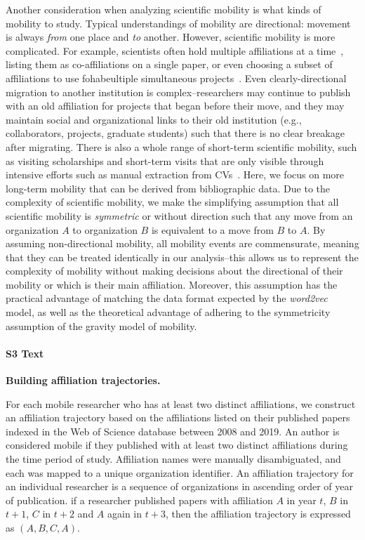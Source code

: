 \documentclass[12pt]{article} %
\begin{document}
Another consideration when analyzing scientific mobility is what kinds of mobility to study.
Typical understandings of mobility are directional: movement is always \textit{from} one place and \textit{to} another.
However, scientific mobility is more complicated.
For example, scientists often hold multiple affiliations at a time~\autocite{markova2016synchronous}, listing them as co-affiliations on a single paper, or even choosing a subset of affiliations to use fohabeultiple simultaneous projects~\autocite{robinson2019mobility}.
Even clearly-directional migration to another institution is complex--researchers may continue to publish with an old affiliation for projects that began before their move, and they may maintain social and organizational links to their old institution (e.g., collaborators, projects, graduate students) such that there is no clear breakage after migrating.
There is also a whole range of short-term scientific mobility, such as visiting scholarships and short-term visits that are only visible through intensive efforts such as manual extraction from CVs~\autocite{woolley2009cv, sandstrom2009cv, canibano2011temporary}.
Here, we focus on more long-term mobility that can be derived from bibliographic data.
Due to the complexity of scientific mobility, we make the simplifying assumption that all scientific mobility is \textit{symmetric} or without direction such that any move from an organization $A$ to organization $B$ is equivalent to a move from $B$ to $A$.
By assuming non-directional mobility, all mobility events are commensurate, meaning that they can be treated identically in our analysis--this allows us to represent the complexity of mobility without making decisions about the directional of their mobility or which is their main affiliation.
Moreover, this assumption has the practical advantage of matching the data format expected by the \textit{word2vec} model, as well as the theoretical advantage of adhering to the symmetricity assumption of the gravity model of mobility.



%
\paragraph*{S3 Text}
\label{si:text:mobility_traj}
{\bf Building affiliation trajectories.}

For each mobile researcher who has at least two distinct affiliations, we construct an affiliation trajectory based on the affiliations listed on their published papers indexed in the Web of Science database between 2008 and 2019.
An author is considered mobile if they published with at least two distinct affiliations during the time period of study.
Affiliation names were manually disambiguated, and each was mapped to a unique organization identifier.
An affiliation trajectory for an individual researcher is a sequence of organizations in ascending order of year of publication.
if a researcher published papers with affiliation $A$ in year $t$, $B$ in $t+1$, $C$ in $t+2$ and $A$ again in $t+3$, then the affiliation trajectory is expressed as $(A, B, C, A)$.
\end{document}
